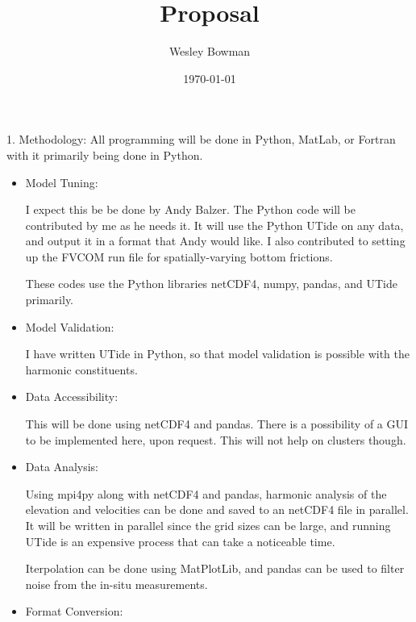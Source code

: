 \documentclass[12pt]{article}
\theoremstyle{definition}
\begin{document}
\title{Proposal}
\author{Wesley Bowman}
\date{\today}
\maketitle

    1. Methodology:
        All programming will be done in Python, MatLab, or Fortran with it
        primarily being done in Python.

        \begin{itemize}
            \item Model Tuning: 

                I expect this be be done by Andy Balzer. The
                Python code will be contributed by me as he needs it. It will
                use the Python UTide on any data, and output it in a format
                that Andy would like. I also contributed to setting up the
                FVCOM run file for spatially-varying bottom frictions.

                These codes use the Python libraries netCDF4, numpy, pandas,
                and UTide primarily.

            \item Model Validation:

                I have written UTide in Python, so that model validation is
                possible with the harmonic constituents.


            \item Data Accessibility:

                This will be done using netCDF4 and pandas. There is a
                possibility of a GUI to be implemented here, upon request.
                This will not help on clusters though.

            \item Data Analysis:

                Using mpi4py along with netCDF4 and pandas, harmonic analysis
                of the elevation and velocities can be done and saved to an
                netCDF4 file in parallel. It will be written in parallel since
                the grid sizes can be large, and running UTide is an expensive
                process that can take a noticeable time.

                Iterpolation can be done using MatPlotLib, and pandas can be
                used to filter noise
                from the in-situ measurements.

            \item Format Conversion:


\end{itemize}
\end{document}
